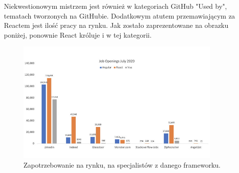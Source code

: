\documentclass[12pt]{article}
\begin{document}
\begin{sloppypar}
{{  Niekwestionowym mistrzem jest również w kategoriach GitHub "Used by", tematach tworzonych na GitHubie.\cite{frontend-popularity} Dodatkowym atutem przemawiającym za Reactem jest 
  ilość pracy na rynku. Jak zostało zaprezentowane na obrazku poniżej, ponownie React króluje i w tej kategorii. 
  \begin{figure}[H]
    \centering
    \includegraphics[width=0.9\textwidth]{frontend_jobs.jpg}
    \caption{Zapotrzebowanie na rynku, na specjalistów z danego frameworku.\cite{accenture}}
    \label{fig:frontend-jobs}
  \end{figure}
}
}
\end{sloppypar}
\end{document}
